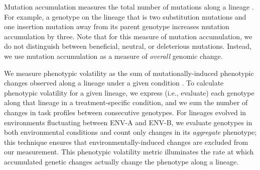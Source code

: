 
Mutation accumulation measures the total number of mutations along a lineage \citep{dolson_interpreting_2020}.
For example, a genotype on the lineage that is two substitution mutations and one insertion mutation away from its parent genotype increases mutation accumulation by three.
Note that for this measure of mutation accumulation, we do not distinguish between beneficial, neutral, or deleterious mutations. 
Instead, we use mutation accumulation as a measure of \textit{overall} genomic change.


We measure phenotypic volatility as the sum of mutationally-induced phenotypic changes observed along a lineage under a given condition \citep{dolson_interpreting_2020}.
To calculate phenotypic volatility for a given lineage, we express (i.e., evaluate) each genotype along that lineage in a treatment-specific condition, and we sum the number of changes in task profiles between consecutive genotypes.
For lineages evolved in environments fluctuating between ENV-A and ENV-B, we evaluate genotypes in both environmental conditions and count only changes in its \textit{aggregate} phenotype; this technique ensures that environmentally-induced changes are excluded from our measurement.
This phenotypic volatility metric illuminates the rate at which accumulated genetic changes actually change the phenotype along a lineage. %

